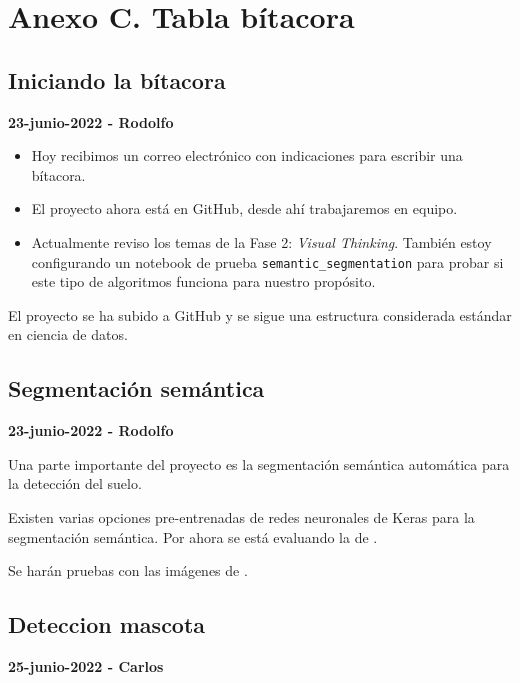 \section*{Anexo C. Tabla bítacora}


\subsection*{Iniciando la bítacora}

\textbf{23-junio-2022 - Rodolfo}


\begin{itemize}
    \item Hoy recibimos un correo electrónico con indicaciones para escribir una bítacora.
    \item El proyecto ahora está en GitHub, desde ahí trabajaremos en equipo.
    \item Actualmente reviso los temas de la Fase 2: \textit{Visual Thinking}.
     También estoy configurando un notebook de prueba \texttt{semantic\_segmentation} para probar si este tipo de algoritmos funciona para nuestro propósito.
\end{itemize}


El proyecto se ha subido a GitHub y se sigue una estructura considerada estándar en ciencia de datos.

\subsection*{Segmentación semántica}

\textbf{23-junio-2022 - Rodolfo}

Una parte importante del proyecto es la segmentación semántica automática para la detección del suelo.

Existen varias opciones pre-entrenadas de redes neuronales de Keras para la segmentación semántica. Por ahora se está evaluando la de \textcite{gupta2022}.

Se harán pruebas con las imágenes de \textcite{unity2022}.

\subsection*{Deteccion mascota}

\textbf{25-junio-2022 - Carlos}

